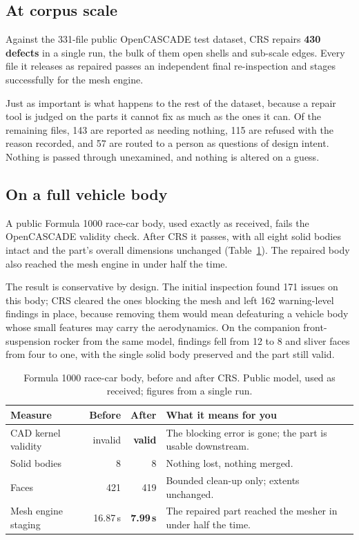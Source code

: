 \documentclass[10pt,onecolumn]{article}
\begin{document}
\subsection{At corpus scale}

Against the 331-file public OpenCASCADE test dataset, CRS repairs \textbf{430 defects} in a single
run, the bulk of them open shells and sub-scale edges. Every file it releases as repaired passes an
independent final re-inspection and stages successfully for the mesh engine.

Just as important is what happens to the rest of the dataset, because a repair tool is judged on
the parts it cannot fix as much as the ones it can. Of the remaining files, 143 are reported as
needing nothing, 115 are refused with the reason recorded, and 57 are routed to a person as
questions of design intent. Nothing is passed through unexamined, and nothing is altered on a
guess.

\subsection{On a full vehicle body}

A public Formula 1000 race-car body, used exactly as received, fails the OpenCASCADE validity
check. After CRS it passes, with all eight solid bodies intact and the part's overall dimensions
unchanged (Table~\ref{tab:f1000}). The repaired body also reached the mesh engine in under half the
time.

The result is conservative by design. The initial inspection found 171 issues on this body; CRS
cleared the ones blocking the mesh and left 162 warning-level findings in place, because removing
them would mean defeaturing a vehicle body whose small features may carry the aerodynamics. On the
companion front-suspension rocker from the same model, findings fell from 12 to 8 and sliver faces
from four to one, with the single solid body preserved and the part still valid.

\begin{table}[h]
\centering
\caption{Formula 1000 race-car body, before and after CRS. Public model, used as received; figures
from a single run.}
\label{tab:f1000}
\footnotesize
\begin{tabularx}{\textwidth}{@{}l r r >{\raggedright\arraybackslash}X@{}}
\toprule
\textbf{Measure} & \textbf{Before} & \textbf{After} & \textbf{What it means for you}\\
\midrule
CAD kernel validity & invalid  & \textbf{valid}   & The blocking error is gone; the part is usable downstream.\\
Solid bodies        & 8        & 8                & Nothing lost, nothing merged.\\
Faces               & 421      & 419              & Bounded clean-up only; extents unchanged.\\
Mesh engine staging & 16.87\,s & \textbf{7.99\,s} & The repaired part reached the mesher in under half the time.\\
\bottomrule
\end{tabularx}
\end{table}
\end{document}
